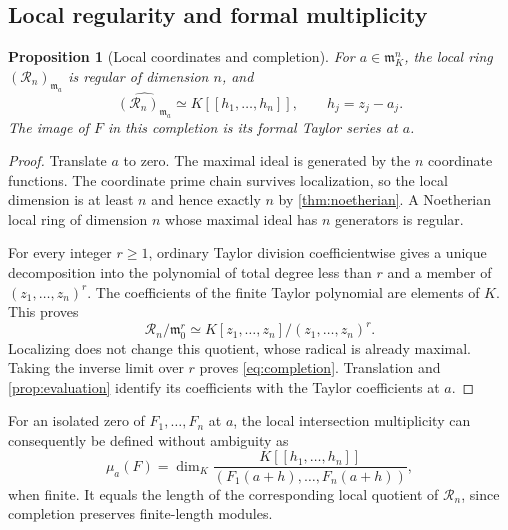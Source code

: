\documentclass[11pt]{article}
\newtheorem{proposition}[theorem]{Proposition}
\theoremstyle{definition}
\newcommand{\RR}{\mathscr R}
\newcommand{\mm}{\mathfrak m}
\begin{document}
\subsection{Local regularity and formal multiplicity}
\begin{proposition}[Local coordinates and completion]\label{prop:completion}
For $a\in\mm_K^n$, the local ring $(\RR_n)_{\mm_a}$ is regular of dimension $n$, and
\begin{equation}\label{eq:completion}
 \widehat{(\RR_n)_{\mm_a}}\simeq K[[h_1,\ldots,h_n]],
 \qquad h_j=z_j-a_j.
\end{equation}
The image of $F$ in this completion is its formal Taylor series at $a$.
\end{proposition}
\begin{proof}
Translate $a$ to zero. The maximal ideal is generated by the $n$ coordinate functions. The coordinate prime chain survives localization, so the local dimension is at least $n$ and hence exactly $n$ by \cref{thm:noetherian}. A Noetherian local ring of dimension $n$ whose maximal ideal has $n$ generators is regular.

For every integer $r\ge1$, ordinary Taylor division coefficientwise gives a unique decomposition into the polynomial of total degree less than $r$ and a member of $(z_1,\ldots,z_n)^r$. The coefficients of the finite Taylor polynomial are elements of $K$. This proves
\[
 \RR_n/\mm_0^r\simeq K[z_1,\ldots,z_n]/(z_1,\ldots,z_n)^r.
\]
Localizing does not change this quotient, whose radical is already maximal. Taking the inverse limit over $r$ proves \eqref{eq:completion}. Translation and \cref{prop:evaluation} identify its coefficients with the Taylor coefficients at $a$.
\end{proof}
For an isolated zero of $F_1,\ldots,F_n$ at $a$, the local intersection multiplicity can consequently be defined without ambiguity as
\begin{equation}\label{eq:localmultiplicity}
 \mu_a(F)=\dim_K
 \frac{K[[h_1,\ldots,h_n]]}
      {(F_1(a+h),\ldots,F_n(a+h))},
\end{equation}
when finite. It equals the length of the corresponding local quotient of $\RR_n$, since completion preserves finite-length modules.
\end{document}
